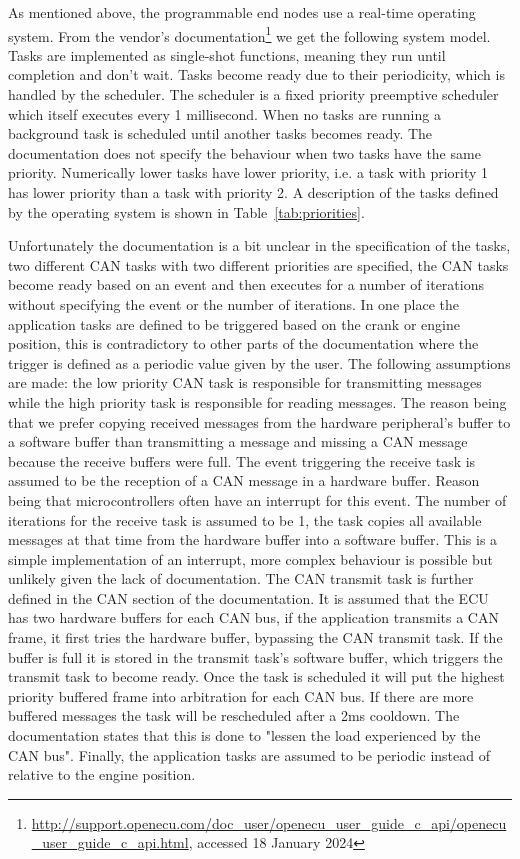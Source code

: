 \label{subsec:programmablenode}
As mentioned above, the programmable end nodes use a real-time operating system. From the vendor's documentation\footnote{\url{http://support.openecu.com/doc_user/openecu_user_guide_c_api/openecu_user_guide_c_api.html}, accessed 18 January 2024} we get the following system model. Tasks are implemented as single-shot functions, meaning they run until completion and don't wait. Tasks become ready due to their periodicity, which is handled by the scheduler. The scheduler is a fixed priority preemptive scheduler which itself executes every 1 millisecond. When no tasks are running a background task is scheduled until another tasks becomes ready. The documentation does not specify the behaviour when two tasks have the same priority. Numerically lower tasks have lower priority, i.e. a task with priority 1 has lower priority than a task with priority 2. A description of the tasks defined by the operating system is shown in Table~\ref{tab:priorities}. 



Unfortunately the documentation is a bit unclear in the specification of the tasks, two different CAN tasks with two different priorities are specified, the CAN tasks become ready based on an event and then executes for a number of iterations without specifying the event or the number of iterations. In one place the application tasks are defined to be triggered based on the crank or engine position, this is contradictory to other parts of the documentation where the trigger is defined as a periodic value given by the user. The following assumptions are made: the low priority CAN task is responsible for transmitting messages while the high priority task is responsible for reading messages. The reason being that we prefer copying received messages from the hardware peripheral's buffer to a software buffer than transmitting a message and missing a CAN message because the receive buffers were full. The event triggering the receive task is assumed to be the reception of a CAN message in a hardware buffer. Reason being that microcontrollers often have an interrupt for this event. The number of iterations for the receive task is assumed to be 1, the task copies all available messages at that time from the hardware buffer into a software buffer. This is a simple implementation of an interrupt, more complex behaviour is possible but unlikely given the lack of documentation. The CAN transmit task is further defined in the CAN section of the documentation. It is assumed that the ECU has two hardware buffers for each CAN bus, if the application transmits a CAN frame, it first tries the hardware buffer, bypassing the CAN transmit task. If the buffer is full it is stored in the transmit task's software buffer, which triggers the transmit task to become ready. Once the task is scheduled it will put the highest priority buffered frame into arbitration for each CAN bus. If there are more buffered messages the task will be rescheduled after a 2ms cooldown. The documentation states that this is done to "lessen the load experienced by the CAN bus". Finally, the application tasks are assumed to be periodic instead of relative to the engine position.

